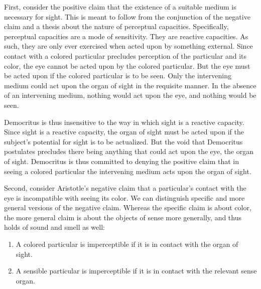 
First, consider the positive claim that the existence of a suitable medium is necessary for sight. This is meant to follow from the conjunction of the negative claim and a thesis about the nature of perceptual capacities. Specifically, perceptual capacities are a mode of sensitivity. They are reactive capacities. As such, they are only ever exercised when acted upon by something external. Since contact with a colored particular precludes perception of the particular and its color, the eye cannot be acted upon by the colored particular. But the eye must be acted upon if the colored particular is to be seen. Only the intervening medium could act upon the organ of sight in the requisite manner. In the absence of an intervening medium, nothing would act upon the eye, and nothing would be seen.

Democritus is thus insensitive to the way in which sight is a reactive capacity. Since sight is a reactive capacity, the organ of sight must be acted upon if the subject's potential for sight is to be actualized. But the void that Democritus postulates precludes there being anything that could act upon the eye, the organ of sight. Democritus is thus committed to denying the positive claim that in seeing a colored particular the intervening medium acts upon the organ of sight.

Second, consider Aristotle's negative claim that a particular's contact with the eye is incompatible with seeing its color.  We can distinguish specific and more general versions of the negative claim. Whereas the specific claim is about color, the more general claim is about the objects of sense more generally, and thus holds of sound and smell as well:
\begin{enumerate}[(1)]
	\item A colored particular is imperceptible if it is in contact with the organ of sight.
	\item A sensible particular is imperceptible if it is in contact with the relevant sense organ.
\end{enumerate}

